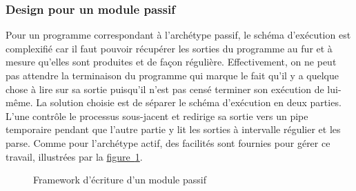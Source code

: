 \documentclass[]{article}
\newcommand{\wordlink}[2]{\hyperref[#1]{#2~\ref{#1}}}
\begin{document}
\newpage

\subsubsection{Design pour un module passif}

Pour un programme correspondant à l'archétype passif, le schéma d'exécution est complexifié car il faut pouvoir récupérer les sorties du programme au fur et à mesure qu'elles sont produites et de façon régulière. Effectivement, on ne peut pas attendre la terminaison du programme qui marque le fait qu'il y a quelque chose à lire sur sa sortie puisqu'il n'est pas censé terminer son exécution de lui-même. La solution choisie est de séparer le schéma d'exécution en deux parties. L'une contrôle le processus sous-jacent et redirige sa sortie vers un pipe temporaire pendant que l'autre partie y lit les sorties à intervalle régulier et les parse. Comme pour l'archétype actif, des facilités sont fournies pour gérer ce travail, illustrées par la \wordlink{abstrpassif}{figure}.

    \begin{figure}[!h]
       \noindent{}
       \caption{Framework d'écriture d'un module passif}
       \label{abstrpassif}
    \end{figure}
\end{document}
